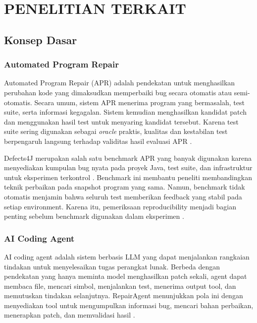 \chapter{PENELITIAN TERKAIT}

\section{Konsep Dasar}

\subsection{Automated Program Repair}

Automated Program Repair (APR) adalah pendekatan untuk menghasilkan perubahan kode yang dimaksudkan memperbaiki bug secara otomatis atau semi-otomatis. Secara umum, sistem APR menerima program yang bermasalah, test suite, serta informasi kegagalan. Sistem kemudian menghasilkan kandidat patch dan menggunakan hasil test untuk menyaring kandidat tersebut. Karena test suite sering digunakan sebagai \textit{oracle} praktis, kualitas dan kestabilan test berpengaruh langsung terhadap validitas hasil evaluasi APR \cite{defects4j2014,qin2021flaky}.

Defects4J merupakan salah satu benchmark APR yang banyak digunakan karena menyediakan kumpulan bug nyata pada proyek Java, test suite, dan infrastruktur untuk eksperimen terkontrol \cite{defects4j2014}. Benchmark ini membantu peneliti membandingkan teknik perbaikan pada snapshot program yang sama. Namun, benchmark tidak otomatis menjamin bahwa seluruh test memberikan feedback yang stabil pada setiap environment. Karena itu, pemeriksaan reproducibility menjadi bagian penting sebelum benchmark digunakan dalam eksperimen \cite{krafczyk2026}.

\subsection{AI Coding Agent}

AI coding agent adalah sistem berbasis LLM yang dapat menjalankan rangkaian tindakan untuk menyelesaikan tugas perangkat lunak. Berbeda dengan pendekatan yang hanya meminta model menghasilkan patch sekali, agent dapat membaca file, mencari simbol, menjalankan test, menerima output tool, dan memutuskan tindakan selanjutnya. RepairAgent menunjukkan pola ini dengan menyediakan tool untuk mengumpulkan informasi bug, mencari bahan perbaikan, menerapkan patch, dan memvalidasi hasil \cite{repairagent2025}.

